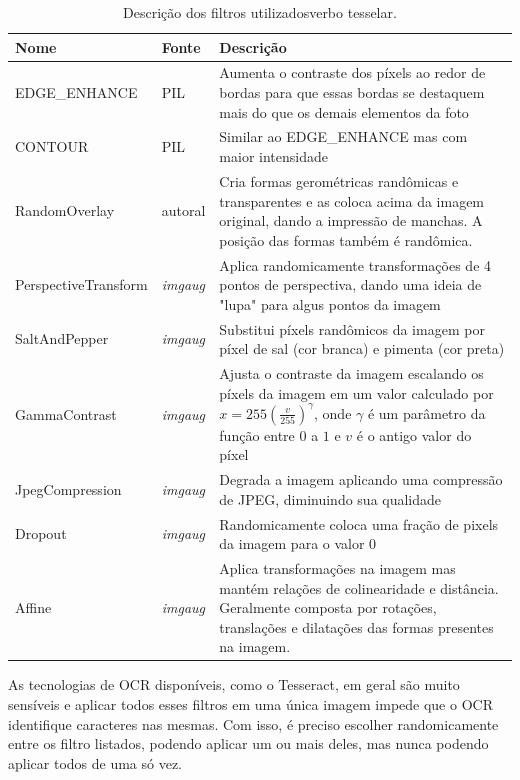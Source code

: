 \begin{table}[H]
  \centering
  \caption{Descrição dos filtros utilizadosverbo tesselar.}
  \begin{tabular}{|m{.25\linewidth}|m{.1\linewidth}|m{.55\linewidth}|}
    \hline
      \textbf{Nome}  &
      \textbf{Fonte}  &
      \textbf{Descrição} \\
    \hline
      EDGE\_ENHANCE  &
      PIL  &
      Aumenta o contraste dos píxels ao redor de bordas para que essas bordas se destaquem mais do que os demais elementos da foto  \\
    \hline
      CONTOUR  &
      PIL  &
      Similar ao EDGE\_ENHANCE mas com maior intensidade \\
    \hline
      RandomOverlay  &
      autoral  &
      Cria formas gerométricas randômicas e transparentes e as coloca acima da imagem original, dando a impressão de manchas. A posição das formas também é randômica. \\
    \hline
      PerspectiveTransform  &
      \textit{imgaug}  &
      Aplica randomicamente transformações de 4 pontos de perspectiva, dando uma ideia de "lupa" para algus pontos da imagem \\
    \hline
      SaltAndPepper  &
      \textit{imgaug}  &
      Substitui píxels randômicos da imagem por píxel de sal (cor branca) e pimenta (cor preta) \\
    \hline
      GammaContrast  &
      \textit{imgaug}  &
      Ajusta o contraste da imagem escalando os píxels da imagem em um valor calculado por \(x = 255(\frac{v}{255})^{\gamma}\), onde $\gamma$ é um parâmetro da função entre $0$ a $1$ e $v$ é o antigo valor do píxel \\
    \hline
      JpegCompression  &
      \textit{imgaug}  &
      Degrada a imagem aplicando uma compressão de JPEG, diminuindo sua qualidade \\
    \hline
      Dropout  &
      \textit{imgaug}  &
      Randomicamente coloca uma fração de pixels da imagem para o valor 0 \\
    \hline
      Affine  &
      \textit{imgaug}  &
      Aplica transformações na imagem mas mantém relações de colinearidade e distância. Geralmente composta por rotações, translações e dilatações das formas presentes na imagem. \\
    \hline
  \end{tabular}
  \label{tab:sdas}
\end{table}

As tecnologias de OCR disponíveis, como o Tesseract, em geral são muito sensíveis e aplicar todos esses filtros em uma única imagem impede que o OCR identifique caracteres nas mesmas. Com isso, é preciso escolher randomicamente entre os filtro listados, podendo aplicar um ou mais deles, mas nunca podendo aplicar todos de uma só vez.

